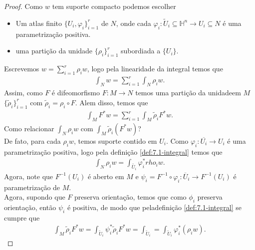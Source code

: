\begin{proof} 
  Como $w$ tem suporte compacto podemos escolher
  \begin{itemize}
    \item Um atlas finito $\{U_i,\varphi_i\}_{i=1}^{r}$ de $N$, onde cada $\varphi_i:\tilde{U}_i\subseteq\mathbb{H}^{n}\to U_i\subseteq N$ é uma parametrização positiva.
    \item uma partição da unidade $\{\rho_i\}_{i=1}^{r}$ subordiada a $\{U_i\}$. 
  \end{itemize}
  Escrevemos $w=\sum_{i=1}^{r}\rho_i w$, logo pela linearidade da integral temos que
  \begin{align*}
    \int_{N}w=\sum_{i=1}^{r}\int_{N}\rho_i w.
  \end{align*}
  Assim, como $F$ é difeomorfismo $F:M\to N$ temos uma partição da unidadeem $M$ $\{\tilde{\rho}_i\}_{i=1}^{r}$ com $\tilde{\rho}_i=\rho_i\circ F$. Alem disso, temos que
  \begin{align*}
    \int_{M}F^{\ast}w=\sum_{i=1}^{r}\int_{M}\tilde{\rho}_i F^{\ast}w.
  \end{align*}
  Como relacionar $\int_N\rho_iw$ com $\int_{M}\tilde{\rho}_{i}(F^{\ast}w)$?\\
  De fato, para cada $\rho_i w$, temos suporte contido em $U_i$. Como $\varphi_i:\overline{U_i}\to U_i$ é uma parametrização positiva, logo pela definição \ref{def:7.1-integral} temos que
  \begin{align*}
    \int_{N}\rho_i w=\int_{\tilde{U_i}}\varphi_i^{\ast}rho_i w.
  \end{align*}
  Agora, note que $F^{-1}(U_i)$ é aberto em $M$ e $\psi_i=F^{-1}\circ\varphi_i:\overline{U}_i\to F^{-1}(U_i)$ é parametrização de $M$.\\
  Agora, supondo que $F$ preserva orientação, temos que como $\phi_i$ preserva orientação, então $\psi_i$ é positiva, de modo que peladefinição \ref{def:7.1-integral} se cumpre que
  \begin{align*}
    \int_M\tilde{\rho}_iF^{\ast}w=\int_{\tilde{U}_i}\psi_i^{\ast}\tilde{\rho}_iF^{\ast}w=\int_{\tilde{U}_i}=\int_{\tilde{U}_i}\varphi_i^{\ast}(\rho_iw).
  \end{align*}
\end{proof}
